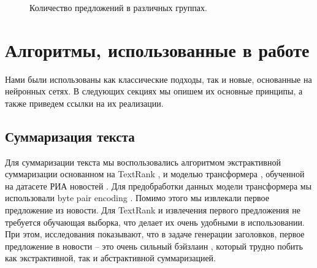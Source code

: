 \documentclass[14pt]{matmex-diploma-custom}
\begin{document}
\begin{figure}[ht]
\begin{center}


\caption{
\label{img:sentence_counts} Количество предложений в различных группах.
        }
\end {center}
\end {figure}

\section{Алгоритмы, использованные в работе}
Нами были использованы как классические подходы, так и новые, основанные на нейронных сетях.
В следующих секциях мы опишем их основные принципы, а также приведем ссылки на их реализации.

\subsection{Суммаризация текста}
Для суммаризации текста мы воспользовались алгоритмом экстрактивной суммаризации
основанном на TextRank \cite{DBLP:journals/corr/BarriosLAW16, rehurek_lrec, TextrankOriginal},
и моделью трансформера \cite{DBLP:journals/corr/VaswaniSPUJGKP17}, обученной на
датасете РИА новостей \cite{gavrilov2018self}.
Для предобработки данных модели трансформера мы использовали byte
pair encoding \cite{DBLP:journals/corr/SennrichHB15}.
Помимо этого мы извлекали первое предложение из новости.
Для TextRank и извлечения первого предложения не требуется обучающая выборка, что
делает их очень удобными в использовании. При этом, исследования показывают, что
в задаче генерации заголовков, первое предложение в новости --
это очень сильный бэйзлаин \cite{gavrilov2018self},
который трудно побить как экстрактивной, так и абстрактивной суммаризацией.
\end{document}
